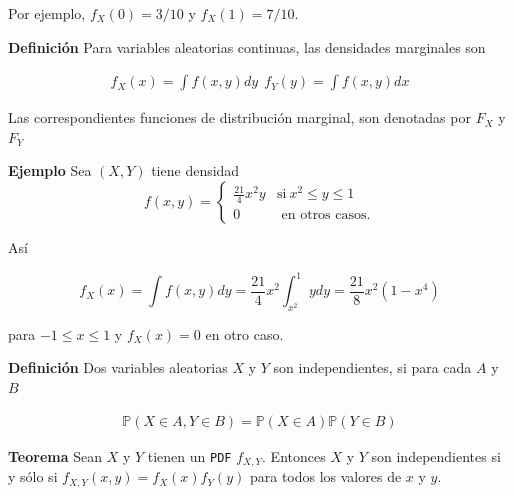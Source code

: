 \documentclass{article}\usepackage[]{graphicx}\usepackage[]{color}
\begin{document}
\vspace{0.2cm}

Por ejemplo, $f_{X}(0) = 3/10$ y $f_{X}(1) = 7/10$.


\vspace{0.8cm}

\textbf{Definici\'on} Para variables aleatorias continuas, las densidades marginales son

\vspace{0.2cm}

\begin{align}
f_{X}(x) = \int f(x,y)dy \ \ f_{Y}(y) = \int f(x,y)dx
\end{align}

\vspace{0.2cm}

Las correspondientes funciones de distribuci\'on marginal, son denotadas por $F_X$ y $F_{Y}$

\vspace{0.5cm}

\textbf{Ejemplo} Sea $(X,Y)$ tiene densidad
\[
f(x,y) = \begin{cases}
\frac{21}{4}x^2y & \mbox{si}\ x^2 \leq y \leq 1 \\
0 & \mbox{ en otros casos}.
\end{cases}
\]

\vspace{0.3cm}

As\'i

\vspace{0.2cm}


\[
f_{X}(x) = \int f(x,y)dy = \frac{21}{4}x^2\int_{x^2}^{1}ydy = \frac{21}{8}x^2(1 - x^4)
\]

\vspace{0.2cm}

para $-1 \leq x \leq 1$ y $f_{X}(x) = 0$ en otro caso.



\vspace{0.8cm}

\textbf{Definici\'on} Dos variables aleatorias $X$ y $Y$ son independientes, si para cada $A$ y $B$

\begin{align}
\mathbb{P}(X \in A, Y \in B) = \mathbb{P}(X \in A)\mathbb{P}(Y \in B)
\end{align}


\vspace{0.5cm}

\textbf{Teorema} Sean $X$ y $Y$ tienen un \texttt{PDF} $f_{X,Y}$. Entonces $X$ y $Y$ son independientes si y s\'olo si $f_{X,Y}(x,y) = f_{X}(x)f_{Y}(y)$ para todos los valores de $x$ y $y$.
\end{document}
